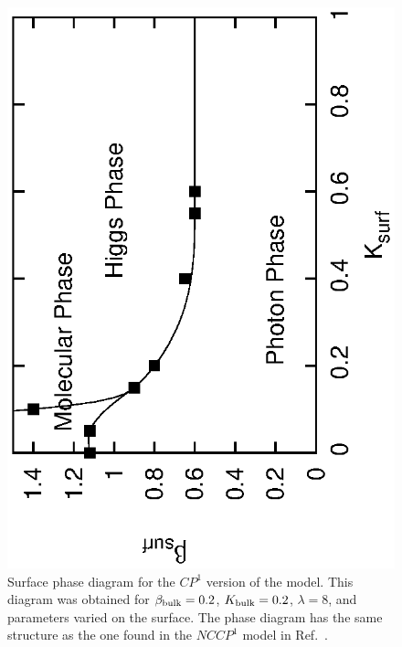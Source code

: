 \documentclass[prb,twocolumn]{revtex4}
\begin{document}
\begin{figure}
\includegraphics[angle=-90,width=0.9\linewidth]{figures/cp1surfphase.eps}
\caption{Surface phase diagram for the $CP^1$ version of the model. This diagram was obtained for $\beta_{\rm bulk}=0.2$, $K_{\rm bulk}=0.2$, $\lambda=8$, and parameters varied on the surface. The phase diagram has the same structure as the one found in the $NCCP^1$ model in Ref.~\cite{LesikAshvin2}. }
\label{cp1surfphase}
\end{figure}
\end{document}
